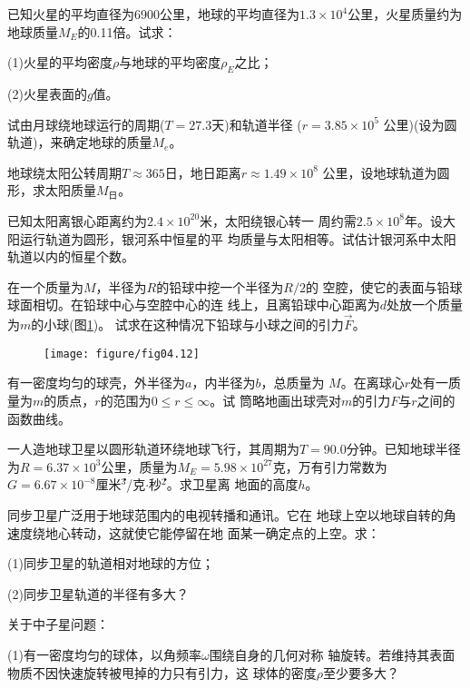 \begin{exercises}
\exercise 已知火星的平均直径为6900公里，地球的平均直径为$ 1.3
  \times 1 0 ^ { 4 } $公里，火星质量约为地球质量$ M _ { E } $的0.11倍。试求：

(1)火星的平均密度$\rho$与地球的平均密度$ \rho _ E $之比；

(2)火星表面的$ g $值。

\exercise 试由月球绕地球运行的周期($ T = 2 7 . 3 $天)和轨道半径
($ r = 3 . 8 5 \times 1 0 ^ { 5 } $ 公里)(设为圆轨道)，来确定地球的质量$ M _ e $。

\exercise 地球绕太阳公转周期$ T \approx 3 6 5 $日，地日距离$ r \approx 1 . 4 9 \times 1 0 ^ { 8 } $
公里，设地球轨道为圆形，求太阳质量$ M _ \text{日} $。

\exercise 已知太阳离银心距离约为$ 2 . 4 \times 1 0 ^ { 2 0 } $米，太阳绕银心转一
周约需$ 2 . 5 \times 1 0 ^ { 8 } $年。设大阳运行轨道为圆形，银河系中恒星的平
均质量与太阳相等。试估计银河系中太阳轨道以内的恒星个数。

\exercise 在一个质量为$ M $，半径为$ R $的铅球中挖一个半径为$ R/2 $的
空腔，使它的表面与铅球球面相切。在铅球中心与空腔中心的连
线上，且离铅球中心距离为$ d $处放一个质量为$ m $的小球(图\ref{fig:04.12})。
试求在这种情况下铅球与小球之间的引力$ \vec{F} $。
\begin{figure}[h]
  \centering
  \texttt{[image: figure/fig04.12]}
  \caption{}
  \label{fig:04.12}
\end{figure}

\exercise 有一密度均匀的球壳，外半径为$ a $，内半径为$ b $，总质量为
$ M $。在离球心$ r $处有一质量为$ m $的质点，$ r $的范围为$ 0 \leqslant r \leqslant \infty $。试
筒略地画出球壳对$ m $的引力$ F $与$ r $之间的函数曲线。

\exercise 一人造地球卫星以圆形轨道环绕地球飞行，其周期为$ T =
  90.0 $分钟。已知地球半径为$ R = 6. 3 7 \times 1 0 ^ { 3 } $公里，质量为$ M _ { E } = 5 . 9 8
  \times 1 0 ^ { 2 7 } $克，万有引力常数为$ G = 6 . 6 7 \times 1 0 ^ { - 8 } $厘米\.$ ^3 $/克$ \cdot $秒\.$ ^2 $。求卫星离
地面的高度$ h $。

\exercise 同步卫星广泛用于地球范围内的电视转播和通讯。它在
地球上空以地球自转的角速度绕地心转动，这就使它能停留在地
面某一确定点的上空。求：

(1)同步卫星的轨道相对地球的方位；

(2)同步卫星轨道的半径有多大？

\exercise 关于中子星问题：

(1)有一密度均匀的球体，以角频率$ \omega $围绕自身的几何对称
轴旋转。若维持其表面物质不因快速旋转被甩掉的力只有引力，这
球体的密度$ \rho $至少要多大？


\end{exercises}
